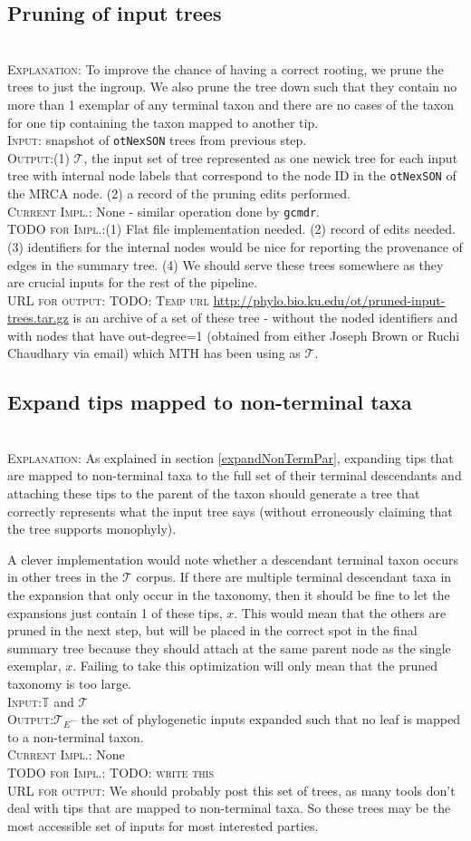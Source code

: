 \documentclass[11pt]{article}
\newcommand{\nexson}[0]{\texttt{otNexSON}\xspace}
\newcommand{\gcmdr}[0]{\texttt{gcmdr}\xspace}
\newcommand{\stepExplanation}[0]{\\\noindent\textsc{Explanation}:\xspace}
\newcommand{\stepInput}[0]{\\\noindent\textsc{Input}:\xspace}
\newcommand{\stepOutput}[0]{\\\noindent\textsc{Output}:\xspace}
\newcommand{\currImpl}[0]{\\\noindent\textsc{Current Impl.}:\xspace}
\newcommand{\implTODO}[0]{\\\noindent\textsc{TODO for Impl.}:\xspace}
\newcommand{\currURL}[0]{\\\noindent\textsc{URL for output}:\xspace}
\newcommand{\comment}[1]{{\color{red} \textsc{#1}}\xspace}
\newcommand{\TODO}[1]{\comment{TODO: #1}}
\newcommand{\taxonomy}[0]{\ensuremath{\mathbb{T}}\xspace}
\newcommand{\phyloInputs}[0]{\ensuremath{\mathcal{T}}}
\newcommand{\expandedPhylo}[0]{\ensuremath{\mathcal{T}_{E}}\xspace}
\begin{document}
\subsection{Pruning of input trees}
\stepExplanation To improve the chance of having a correct rooting, we prune
    the trees to just the ingroup.
    We also prune the tree down such that they contain no more than 1 exemplar of any
    terminal taxon and there are no cases of the taxon for one tip containing
    the taxon mapped to another tip.
\stepInput snapshot of \nexson trees from previous step.
\stepOutput (1) \phyloInputs, the input set of tree represented as
    one newick tree for each input tree with internal node labels that 
    correspond to the node ID in the \nexson of the MRCA node.
    (2) a record of the pruning edits performed.
\currImpl None - similar operation done by \gcmdr.
\implTODO (1) Flat file implementation needed. 
    (2) record of edits needed. 
    (3) identifiers for the internal nodes would be nice for reporting the provenance of edges in the 
    summary tree. 
    (4) We should serve these trees somewhere as they are crucial inputs for the rest of the pipeline.
\currURL \TODO{Temp url} \url{http://phylo.bio.ku.edu/ot/pruned-input-trees.tar.gz} is an
    archive of a set of these tree - without the noded identifiers and with nodes that have 
    out-degree=1 (obtained from either Joseph Brown or Ruchi Chaudhary via email) which MTH has been
    using as \phyloInputs.

    \subsection{Expand tips mapped to non-terminal taxa}\label{expandedPhyloStep}
\stepExplanation As explained in section \ref{expandNonTermPar}, expanding tips that are mapped
    to non-terminal taxa to the full set of their terminal descendants and attaching these
    tips to the parent of the taxon should generate a tree that correctly represents
    what the input tree says (without erroneously claiming that the tree supports monophyly).
    
    A clever implementation would note whether a descendant terminal taxon occurs in other
        trees in the $\phyloInputs$ corpus. 
    If there are multiple terminal descendant taxa in the expansion that only occur in the 
        taxonomy, then it should be fine to let the expansions just contain 1 of these tips, $x$.
    This would mean that the others are pruned in the next step, but will be placed in the 
    correct spot in the final summary tree because they should attach at the same parent node
    as the single exemplar, $x$. Failing to take this optimization will only mean that the 
    pruned taxonomy is too large.
\stepInput \taxonomy and \phyloInputs
\stepOutput \expandedPhylo -- the set of phylogenetic inputs expanded such that no leaf is mapped 
    to a non-terminal taxon.
    \currImpl None
    \implTODO \TODO{write this}
\currURL We should probably post this set of trees, as many tools don't deal with tips that 
are mapped to non-terminal taxa. So these trees may be the most accessible set of inputs
for most interested parties.
 
\end{document}
